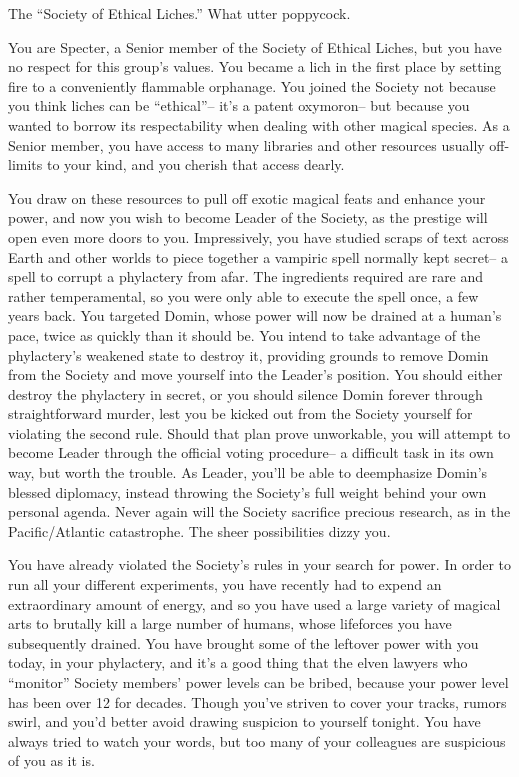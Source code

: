 \documentclass[char]{Sel}
\begin{document}
\name{\cSpecter{}}
The ``Society of Ethical Liches.'' What utter poppycock.

You are Specter, a Senior member of the Society of Ethical Liches, but you have no respect for this group's values. You became a lich in the first place by setting fire to a conveniently flammable orphanage. You joined the Society not because you think liches can be ``ethical''-- it's a patent oxymoron-- but because you wanted to borrow its respectability when dealing with other magical species. As a Senior member, you have access to many libraries and other resources usually off-limits to your kind, and you cherish that access dearly.

You draw on these resources to pull off exotic magical feats and enhance your power, and now you wish to become Leader of the Society, as the prestige will open even more doors to you. Impressively, you have studied scraps of text across Earth and other worlds to piece together a vampiric spell normally kept secret-- a spell to corrupt a phylactery from afar. The ingredients required are rare and rather temperamental, so you were only able to execute the spell once, a few years back. You targeted Domin, whose power will now be drained at a human's pace, twice as quickly than it should be. You intend to take advantage of the phylactery's weakened state to destroy it, providing grounds to remove Domin from the Society and move yourself into the Leader's position. You should either destroy the phylactery in secret, or you should silence Domin forever through straightforward murder, lest you be kicked out from the Society yourself for violating the second rule. Should that plan prove unworkable, you will attempt to become Leader through the official voting procedure-- a difficult task in its own way, but worth the trouble. As Leader, you'll be able to deemphasize Domin's blessed diplomacy, instead throwing the Society's full weight behind your own personal agenda. Never again will the Society sacrifice precious research, as in the Pacific/Atlantic catastrophe. The sheer possibilities dizzy you.

You have already violated the Society's rules in your search for power. In order to run all your different experiments, you have recently had to expend an extraordinary amount of energy, and so you have used a large variety of magical arts to brutally kill a large number of humans, whose lifeforces you have subsequently drained. You have brought some of the leftover power with you today, in your phylactery, and it's a good thing that the elven lawyers who ``monitor'' Society members' power levels can be bribed, because your power level has been over 12 for decades. Though you've striven to cover your tracks, rumors swirl, and you'd better avoid drawing suspicion to yourself tonight. You have always tried to watch your words, but too many of your colleagues are suspicious of you as it is.
\end{document}
